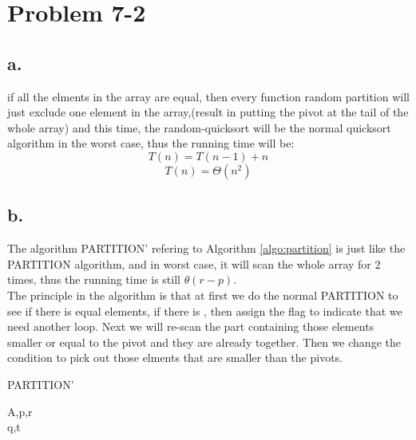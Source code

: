 \documentclass[oneside]{homework} %
\begin{document}
\maketitle
\newpage
\section{Problem 7-2}
\subsection*{a.}
if all the elments in the array are equal, then every function random partition will just exclude one element in the array,(result in putting the pivot at the tail of the whole array) and this time, the random-quicksort will be the normal quicksort algorithm in the worst case, thus the running time will be:
$$ T(n) = T(n-1) + n$$
$$ T(n) = \Theta(n^{2})$$
\subsection*{b.}
The algorithm PARTITION' refering to Algorithm \ref{algo:partition} is just like the PARTITION algorithm, and in worst case, it will scan the whole array for 2 times, thus the running time is still $\theta(r-p)$.
\\ The principle in the algorithm is that at first we do the normal PARTITION to see if there is equal elements, if there is , then assign the flag to indicate that we need another loop. Next we will re-scan the part containing those elements smaller or equal to the pivot and they are already together. Then we change the condition to pick out those elments that are smaller than the pivots. 

  \begin{algorithm}[h]
  \caption{PARTITION'}
  \label{algo:partition}
  \begin{algorithmic}[1]
	\REQUIRE A,p,r
	\ENSURE ~ ~\\ 
	  \ENDIF
	  \ENDIF
	\ENDFOR
		\ENDIF
	  \ENDFOR
	\ELSE 
	\ENDIF
	\LASTCON q,t	
  \end{algorithmic}
  \end{algorithm}
\end{document}
